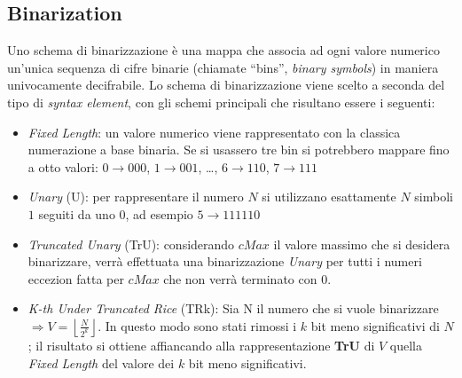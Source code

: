 \subsection{Binarization}
Uno schema di binarizzazione è una mappa che associa ad ogni valore numerico 
un'unica sequenza di cifre binarie (chiamate ``bins'', \emph{binary symbols}) 
in maniera univocamente decifrabile. Lo schema di binarizzazione viene scelto a
seconda del tipo di \emph{syntax element}, con gli schemi principali che 
risultano essere i seguenti:
\begin{itemize}
\item \emph{Fixed Length}: un valore numerico viene rappresentato con la 
  classica numerazione a base binaria. Se si usassero tre bin si potrebbero 
  mappare fino a otto valori: $0 \rightarrow 000$, $1 \rightarrow 001$, 
  {\ldots}, $6 \rightarrow 110$, $7 \rightarrow 111$

\item \emph{Unary} (U): per rappresentare il numero $N$ si utilizzano 
  esattamente $N$ simboli $1$ seguiti da uno $0$, ad esempio $5 \rightarrow 
  111110$

\item \emph{Truncated Unary} (TrU): considerando $cMax$ il valore massimo che 
  si desidera binarizzare, verrà effettuata una binarizzazione \emph{Unary} 
  per tutti i numeri eccezion fatta per $cMax$ che non verrà terminato con $0$.

\item \emph{K-th Under Truncated Rice} (TRk): Sia N il numero che si vuole 
  binarizzare $\Rightarrow V = \left\lfloor\frac{N}{2^k}\right\rfloor$. In 
  questo modo sono stati rimossi i $k$ bit meno significativi di $N$; il 
  risultato si ottiene affiancando alla rappresentazione \textbf{TrU} di $V$ 
  quella \emph{Fixed Length} del valore dei $k$ bit meno significativi.

\end{itemize}

